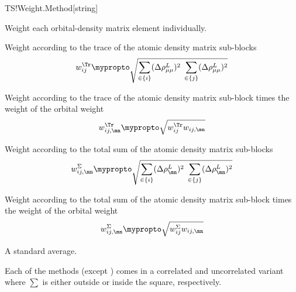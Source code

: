 \begin{fdfentry}{TS!Weight.Method}[string]
  \begin{fdfoptions}

    Weight each orbital-density matrix element individually.

    Weight according to the trace of the atomic density matrix sub-blocks
    \begin{equation}
      w_{ij}^{\Tr} \mypropto
      \sqrt{
          \sum_{\in\{i\}}(\Delta\rho_{\mu\mu}^L)^2
          \; %
          \sum_{\in\{j\}}(\Delta\rho_{\mu\mu}^L)^2
      }
    \end{equation}

    
    Weight according to the trace of the atomic density matrix
    sub-block times the weight of the orbital weight
    \begin{equation}
      w_{ij,\mn}^{\Tr} \mypropto
      \sqrt{
          w_{ij}^{\Tr} 
          w_{ij,\mn}
      }
    \end{equation}

    
    Weight according to the total sum of the atomic density matrix
    sub-blocks
    \begin{equation}
      w_{ij,\mn}^{\Sigma} \mypropto
      \sqrt{
          \sum_{\in\{i\}}(\Delta\rho_{\mn}^L)^2
          \; %
          \sum_{\in\{j\}}(\Delta\rho_{\mn}^L)^2
      }
    \end{equation}

    
    Weight according to the total sum of the atomic density matrix
    sub-block times the weight of the orbital weight
    \begin{equation}
      w_{ij,\mn}^{\Sigma} \mypropto
      \sqrt{
          w_{ij}^{\Sigma} 
          w_{ij,\mn}
      }
    \end{equation}

    \option[mean]%
    
    A standard average.
    
  \end{fdfoptions}


  Each of the methods (except ) comes in a correlated and
  uncorrelated variant where $\sum$ is either outside or inside the
  square, respectively.

\end{fdfentry}

